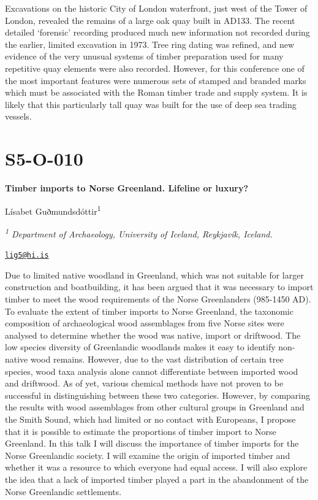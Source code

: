 \documentclass[
]{book}
\begin{document}
Excavations on the historic City of London waterfront, just west of the Tower of London, revealed the remains of a large oak quay built in AD133. The recent detailed `forensic' recording produced much new information not recorded during the earlier, limited excavation in 1973. Tree ring dating was refined, and new evidence of the very unusual systems of timber preparation used for many repetitive quay elements were also recorded. However, for this conference one of the most important features were numerous sets of stamped and branded marks which must be associated with the Roman timber trade and supply system. It is likely that this particularly tall quay was built for the use of deep sea trading vessels.

\hypertarget{s5-o-010}{%
\section*{S5-O-010}\label{s5-o-010}}

\textbf{Timber imports to Norse Greenland. Lifeline or luxury?}

Lísabet Guðmundsdóttir\textsuperscript{1}

\emph{\textsuperscript{1} Department of Archaeology, University of Iceland, Reykjavík, Iceland.}

\href{mailto:lig5@hi.is}{\nolinkurl{lig5@hi.is}}

Due to limited native woodland in Greenland, which was not suitable for larger construction and boatbuilding, it has been argued that it was necessary to import timber to meet the wood requirements of the Norse Greenlanders (985-1450 AD). To evaluate the extent of timber imports to Norse Greenland, the taxonomic composition of archaeological wood assemblages from five Norse sites were analysed to determine whether the wood was native, import or driftwood. The low species diversity of Greenlandic woodlands makes it easy to identify non-native wood remains. However, due to the vast distribution of certain tree species, wood taxa analysis alone cannot differentiate between imported wood and driftwood. As of yet, various chemical methods have not proven to be successful in distinguishing between these two categories. However, by comparing the results with wood assemblages from other cultural groups in Greenland and the Smith Sound, which had limited or no contact with Europeans, I propose that it is possible to estimate the proportions of timber import to Norse Greenland. In this talk I will discuss the importance of timber imports for the Norse Greenlandic society. I will examine the origin of imported timber and whether it was a resource to which everyone had equal access. I will also explore the idea that a lack of imported timber played a part in the abandonment of the Norse Greenlandic settlements.
\end{document}

